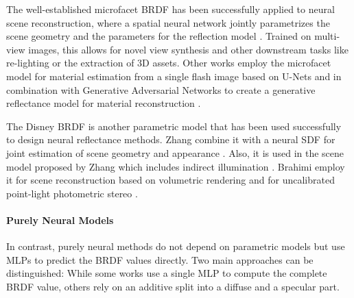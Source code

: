 The well-established microfacet BRDF \cite{torrance1967theory, walter2007microfacet,CookTorranceT82} has been successfully applied to neural scene reconstruction, where a spatial neural network jointly parametrizes the scene geometry and the parameters for the reflection model \cite{bi2020neuralReflectanceFields,srinivasan2021nerv,Boss2021NERD,Zhang22IRON}. Trained on multi-view images, this allows for novel view synthesis and other downstream tasks like re-lighting or the extraction of 3D assets. Other works employ the microfacet model for material estimation from a single flash image based on U-Nets \cite{Deschaintre2018SingleImageSVBRDFCaptureDeepNN,Henzler2021GenerativeModellingBRDFFlashIms} and in combination with Generative Adversarial Networks to create a generative reflectance model for material reconstruction \cite{Guo2020MaterialGAN}.

The Disney BRDF \cite{burley2012physically} is another parametric model that has been used successfully to design neural reflectance methods. Zhang \etal combine it with a neural SDF for joint estimation of scene geometry and appearance \cite{Zhang21PhySG}. Also, it is used in the scene model proposed by Zhang \etal which includes indirect illumination \cite{Zhang2022ModellingIndirIlluminationInvRendering}. Brahimi \etal employ it for scene reconstruction based on volumetric rendering \cite{Brahimi24SuperVol} and for uncalibrated point-light photometric stereo \cite{brahimi24SparseViewsNearLight}.




\paragraph{Purely Neural Models}
In contrast, purely neural methods do not depend on parametric models but use MLPs to predict the BRDF values directly. 
Two main approaches can be distinguished: While some works use a single MLP to compute the complete BRDF value, others rely on an additive split into a diffuse and a specular part.

